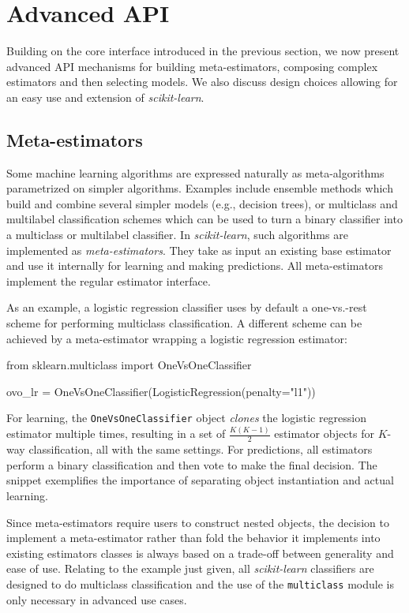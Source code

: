 \documentclass{llncs}
\newcommand{\sklearn}{\textit{scikit-learn}\xspace}
\begin{document}
\section{Advanced API}

\label{sec:advanced-api}

Building on the core interface introduced in the previous section, we now
present advanced API mechanisms for building meta-estimators,
composing complex estimators and then selecting models. We also discuss design
choices allowing for an easy use and extension of \sklearn.

\subsection{Meta-estimators}

Some machine learning algorithms are expressed naturally
as meta-algorithms parametrized on simpler algorithms.
Examples include ensemble methods which
build and combine several simpler models (e.g., decision trees), or multiclass
and multilabel classification schemes which can be used to turn a binary
classifier into a multiclass or multilabel classifier. In \sklearn, such algorithms are
implemented as \textit{meta-estimators}. They take as input an existing base
estimator and use it internally for learning and making predictions.
All meta-estimators implement the regular estimator interface.

As an example, a logistic regression classifier
uses by default a one-vs.-rest scheme
for performing multiclass classification.
A different scheme can be achieved
by a meta-estimator wrapping a logistic regression estimator:
\begin{pythoncode}
from sklearn.multiclass import OneVsOneClassifier

ovo_lr = OneVsOneClassifier(LogisticRegression(penalty="l1"))
\end{pythoncode}
For learning, the \texttt{OneVsOneClassifier} object
\textit{clones} the logistic regression estimator multiple times,
resulting in a set of $\frac{K(K-1)}{2}$ estimator objects
for $K$-way classification,
all with the same settings.
For predictions, all estimators perform a binary classification and then vote to make the final decision.
The snippet exemplifies the importance
of separating object instantiation and actual learning.

Since meta-estimators require users to construct nested objects,
the decision to implement a meta-estimator
rather than fold the behavior it implements
into existing estimators classes
is always based on a trade-off between generality and ease of use.
Relating to the example just given,
all \sklearn classifiers are designed to do multiclass classification
and the use of the \texttt{multiclass} module
is only necessary in advanced use cases.
\end{document}

